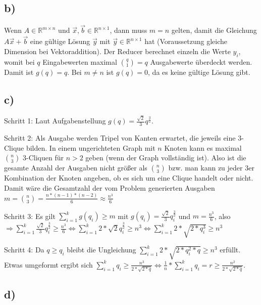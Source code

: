 \documentclass{article}
\begin{document}
\subsection*{b)}
Wenn $A \in \mathbb{R}^{m \times n}$ und $\vec{x}, \vec{b} \in \mathbb{R}^{n \times 1}$, dann muss $m = n$ gelten, damit die Gleichung $A\vec{x} + \vec{b}$ eine g\"ultige L\"osung $\vec{y}$ mit $\vec{y} \in \mathbb{R}^{n \times 1}$ hat (Voraussetzung gleiche Dimension bei Vektoraddition). Der Reducer berechnet einzeln die Werte $y_{i}$, womit bei $q$ Eingabewerten maximal $\binom q 1 = q$ Ausgabewerte \"uberdeckt werden. Damit ist $g(q) = q$. Bei $m \neq n$ ist $g(q) = 0$, da es keine g\"ultige L\"osung gibt. 

\subsection*{c)}
Schritt 1:
Laut Aufgabenstellung $g(q) = \frac{\sqrt 2}{3} q^{\frac{3}{2}}$.

Schritt 2:
Als Ausgabe werden Tripel von Kanten erwartet, die jeweils eine 3-Clique bilden. In einem ungerichteten Graph mit $n$ Knoten kann es maximal $\binom n 3$ 3-Cliquen f\"ur $n > 2$ geben (wenn der Graph vollst\"andig ist). Also ist die gesamte Anzahl der Ausgaben nicht gr\"oßer als $\binom n 3$ bzw. man kann zu jeder 3er Kombination der Knoten angeben, ob es sich um eine Clique handelt oder nicht. Damit w\"are die Gesamtzahl der vom Problem generierten Ausgaben $m = \binom n 3 = \frac{n*(n-1)*(n-2)}{6} \approx \frac{n^3}{6}$

Schritt 3:
Es gilt $\sum_{i=1}^k g(q_i) \geq m$ mit $g(q_i) = \frac{\sqrt 2}{3} q_i^{\frac{3}{2}}$ und $m = \frac{n^3}{6}$, also $\Rightarrow \sum_{i=1}^k \frac{\sqrt 2}{3} q_i^{\frac{3}{2}} \geq \frac{n^3}{6} \Leftrightarrow \sum_{i=1}^k 2*\sqrt 2 q_i^{\frac{3}{2}} \geq n^3 \Leftrightarrow \sum_{i=1}^k 2*\sqrt {2*q_i^3} \geq n^3$

Schritt 4:
Da $q \geq q_i$ bleibt die Ungleichung $\sum_{i=1}^k 2*\sqrt {2*q_i^2*q} \geq n^3$ erf\"ullt. Etwas umgeformt ergibt sich $\sum_{i=1}^k q_i \geq \frac{n^3}{2*\sqrt{2*q}} \Leftrightarrow \frac{1}{n} * \sum_{i=1}^k q_i = r \geq \frac{n^2}{2*\sqrt{2*q}}$.


\subsection*{d)}
\end{document}
